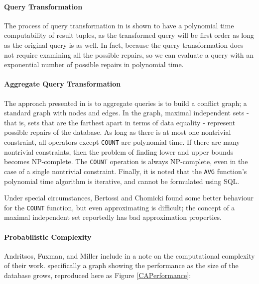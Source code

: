 \paragraph{Query Transformation} 
The process of query transformation in \cite{CQ} is shown to have a polynomial time computability of result tuples, as the transformed query will be first order as long as the original query is as well. In fact, because the query transformation does not require examining all the possible repairs, so we can evaluate a query with an exponential number of possible repairs in polynomial time.

\paragraph{Aggregate Query Transformation}
The approach presented in \cite{CQ} is to aggregate queries is to build a conflict graph; a standard graph with nodes and edges. In the graph, maximal independent sets - that is, sets that are the farthest apart in terms of data equality - represent possible repairs of the database. As long as there is at most one nontrivial constraint, all operators except \texttt{COUNT} are polynomial time. If there are many nontrivial constraints, then the problem of finding lower and upper bounds becomes NP-complete. The \texttt{COUNT} operation is always NP-complete, even in the case of a single nontrivial constraint. Finally, it is noted that the \texttt{AVG} function's polynomial time algorithm is iterative, and cannot be formulated using SQL. 

Under special circumstances, Bertossi and Chomicki found some better behaviour for the \texttt{COUNT} function, but even approximating is difficult; the concept of a maximal independent set reportedly has bad approximation properties.

\paragraph{Probabilistic Complexity}
Andritsos, Fuxman, and Miller include in \cite{CA} a note on the computational complexity of their work.  specifically a graph showing the performance as the size of the database grows, reproduced here as Figure \ref{CAPerformance}:

